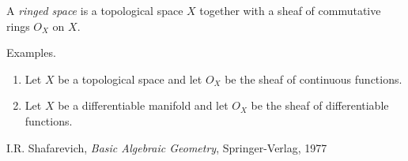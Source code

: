 \documentclass[12pt]{article}
\begin{document}
A \emph{ringed space} is a topological space $X$ together with a sheaf of commutative rings $O_X$ on $X$.

Examples.
\begin{enumerate} 
\item
Let $X$ be a topological space and let $O_X$ be the sheaf of continuous functions.
\item
Let $X$ be a differentiable manifold and let $O_X$ be the sheaf of differentiable
functions.
\end{enumerate}

\begin{thebibliography}{99}
 I.R. Shafarevich, \emph{Basic Algebraic Geometry}, Springer-Verlag, 1977
\end{thebibliography}
\end{document}
